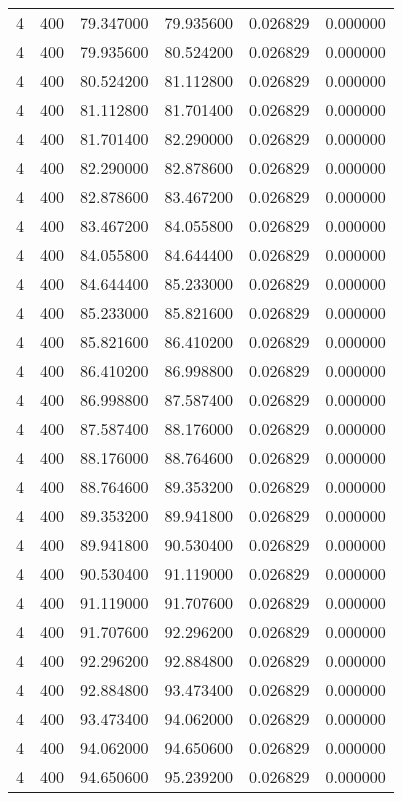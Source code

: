 \begin{longtable}{rrrrrr}
4 & 400 & 79.347000 & 79.935600 & 0.026829 & 0.000000 \\
4 & 400 & 79.935600 & 80.524200 & 0.026829 & 0.000000 \\
4 & 400 & 80.524200 & 81.112800 & 0.026829 & 0.000000 \\
4 & 400 & 81.112800 & 81.701400 & 0.026829 & 0.000000 \\
4 & 400 & 81.701400 & 82.290000 & 0.026829 & 0.000000 \\
4 & 400 & 82.290000 & 82.878600 & 0.026829 & 0.000000 \\
4 & 400 & 82.878600 & 83.467200 & 0.026829 & 0.000000 \\
4 & 400 & 83.467200 & 84.055800 & 0.026829 & 0.000000 \\
4 & 400 & 84.055800 & 84.644400 & 0.026829 & 0.000000 \\
4 & 400 & 84.644400 & 85.233000 & 0.026829 & 0.000000 \\
4 & 400 & 85.233000 & 85.821600 & 0.026829 & 0.000000 \\
4 & 400 & 85.821600 & 86.410200 & 0.026829 & 0.000000 \\
4 & 400 & 86.410200 & 86.998800 & 0.026829 & 0.000000 \\
4 & 400 & 86.998800 & 87.587400 & 0.026829 & 0.000000 \\
4 & 400 & 87.587400 & 88.176000 & 0.026829 & 0.000000 \\
4 & 400 & 88.176000 & 88.764600 & 0.026829 & 0.000000 \\
4 & 400 & 88.764600 & 89.353200 & 0.026829 & 0.000000 \\
4 & 400 & 89.353200 & 89.941800 & 0.026829 & 0.000000 \\
4 & 400 & 89.941800 & 90.530400 & 0.026829 & 0.000000 \\
4 & 400 & 90.530400 & 91.119000 & 0.026829 & 0.000000 \\
4 & 400 & 91.119000 & 91.707600 & 0.026829 & 0.000000 \\
4 & 400 & 91.707600 & 92.296200 & 0.026829 & 0.000000 \\
4 & 400 & 92.296200 & 92.884800 & 0.026829 & 0.000000 \\
4 & 400 & 92.884800 & 93.473400 & 0.026829 & 0.000000 \\
4 & 400 & 93.473400 & 94.062000 & 0.026829 & 0.000000 \\
4 & 400 & 94.062000 & 94.650600 & 0.026829 & 0.000000 \\
4 & 400 & 94.650600 & 95.239200 & 0.026829 & 0.000000 \\

\end{longtable}
